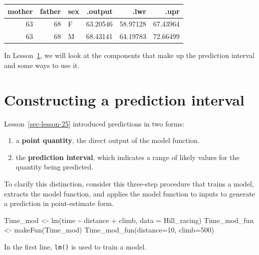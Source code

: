 \documentclass[
  letterpaper,
  DIV=11,
  numbers=noendperiod,
  oneside]{scrreprt}
\newenvironment{Shaded}{\begin{snugshade}}{\end{snugshade}}
\newcommand{\AttributeTok}[1]{\textcolor[rgb]{0.40,0.45,0.13}{#1}}
\newcommand{\DecValTok}[1]{\textcolor[rgb]{0.68,0.00,0.00}{#1}}
\newcommand{\FunctionTok}[1]{\textcolor[rgb]{0.28,0.35,0.67}{#1}}
\newcommand{\NormalTok}[1]{\textcolor[rgb]{0.00,0.23,0.31}{#1}}
\newcommand{\OtherTok}[1]{\textcolor[rgb]{0.00,0.23,0.31}{#1}}
\newcommand{\SpecialCharTok}[1]{\textcolor[rgb]{0.37,0.37,0.37}{#1}}
\providecommand{\tightlist}{%
  \setlength{\itemsep}{0pt}\setlength{\parskip}{0pt}}\usepackage{longtable,booktabs,array}
\begin{document}
\ttfamily 
\begin{tabular}{rrlrrr}
\toprule
mother & father & sex & .output & .lwr & .upr\\
\midrule
63 & 68 & F & 63.20546 & 58.97128 & 67.43964\\
63 & 68 & M & 68.43141 & 64.19783 & 72.66499\\
\bottomrule
\end{tabular} \normalfont
\bigskip

In Lesson~\ref{sec-lesson-26}, we will look at the components that make
up the prediction interval and some ways to use it.

\hypertarget{sec-lesson-26}{%
\chapter{Constructing a prediction interval}\label{sec-lesson-26}}

Lesson~\ref{sec-lesson-25} introduced predictions in two forms:

\begin{enumerate}
\def\labelenumi{\arabic{enumi}.}
\tightlist
\item
  a \textbf{point quantity}, the direct output of the model function.
\item
  the \textbf{prediction interval}, which indicates a range of likely
  values for the quantity being predicted.
\end{enumerate}

To clarify this distinction, consider this three-step procedure that
trains a model, extracts the model function, and applies the model
function to inputs to generate a prediction in point-estimate form.

\begin{Shaded}
\begin{Highlighting}[numbers=left,,]
\NormalTok{Time\_mod }\OtherTok{\textless{}{-}} \FunctionTok{lm}\NormalTok{(time }\SpecialCharTok{\textasciitilde{}}\NormalTok{ distance }\SpecialCharTok{+}\NormalTok{ climb, }\AttributeTok{data =}\NormalTok{ Hill\_racing)}
\NormalTok{Time\_mod\_fun }\OtherTok{\textless{}{-}} \FunctionTok{makeFun}\NormalTok{(Time\_mod)}
\FunctionTok{Time\_mod\_fun}\NormalTok{(}\AttributeTok{distance=}\DecValTok{10}\NormalTok{, }\AttributeTok{climb=}\DecValTok{500}\NormalTok{)}
\end{Highlighting}
\end{Shaded}

In the first line, \texttt{lm()} is used to train a model.
\end{document}
